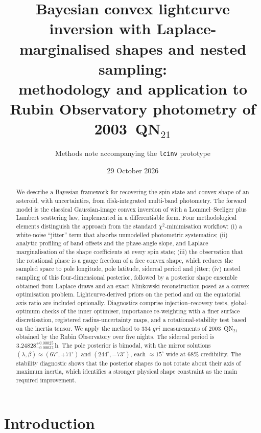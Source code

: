 \documentclass[11pt,a4paper]{article}
\title{Bayesian convex lightcurve inversion with Laplace-marginalised shapes and nested sampling:\\
methodology and application to Rubin Observatory photometry of 2003~QN$_{21}$}
\author{Methods note accompanying the \texttt{lcinv} prototype}
\date{29 October 2026}
\theoremstyle{remark}
\begin{document}
\maketitle

\begin{abstract}
We describe a Bayesian framework for recovering the spin state and convex shape of an asteroid,
with uncertainties, from disk-integrated multi-band photometry. The forward model is the classical
Gaussian-image convex inversion of \citet{kaasalainen2001a,kaasalainen2001b} with a
Lommel--Seeliger plus Lambert scattering law, implemented in a differentiable form. Four
methodological elements distinguish the approach from the standard $\chi^2$-minimisation workflow:
(i) a white-noise ``jitter'' term that absorbs unmodelled photometric systematics;
(ii) analytic profiling of band offsets and the phase-angle slope, and Laplace marginalisation of
the shape coefficients at every spin state;
(iii) the observation that the rotational phase is a gauge freedom of a free convex shape, which
reduces the sampled space to pole longitude, pole latitude, sidereal period and jitter;
(iv) nested sampling of this four-dimensional posterior, followed by a posterior shape ensemble
obtained from Laplace draws and an exact Minkowski reconstruction posed as a convex optimisation
problem. Lightcurve-derived priors on the period and on the equatorial axis ratio are included
optionally. Diagnostics comprise injection--recovery tests, global-optimum checks of the inner
optimiser, importance re-weighting with a finer surface discretisation, registered radius-uncertainty
maps, and a rotational-stability test based on the inertia tensor. We apply the method to 334
$gri$ measurements of 2003~QN$_{21}$ obtained by the Rubin Observatory over five nights. The
sidereal period is $3.24828^{+0.00025}_{-0.00032}$\,h. The pole posterior is bimodal, with the
mirror solutions $(\lambda,\beta)\approx(67^\circ,+71^\circ)$ and $(244^\circ,-73^\circ)$, each
$\approx15^\circ$ wide at 68\% credibility. The stability diagnostic shows that the posterior
shapes do not rotate about their axis of maximum inertia, which identifies a stronger physical
shape constraint as the main required improvement.
\end{abstract}

\tableofcontents

\section{Introduction}
\label{sec:intro}
\end{document}
